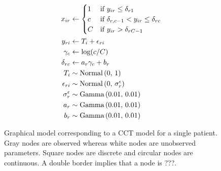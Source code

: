 \documentclass{article}
\newcommand{\DON}[1]{\todo[inline, color=white]{Don: {#1}}}
\newcommand{\Irater}{r}
\newcommand{\Iitem}{i}
\newcommand{\Incat}{c}
\newcommand{\Tncat}{\expandafter\MakeUppercase\expandafter{\Incat}}
\newcommand{\dnorm}[2]{\text{Normal}\left(#1,\,#2\right)}
\newcommand{\dgamma}[2]{\text{Gamma}\left(#1,\,#2\right)}
\begin{document}
\begin{figure}[!ht]
\begin{minipage}{0.5\textwidth}
		\end{minipage}\hfill
	\begin{minipage}{0.5\textwidth}
		{\large
		\begin{align*}
			x_{\Iitem\Irater} &\leftarrow 
			\begin{cases}
			1		& \text{if } y_{\Iitem\Irater} \leq \delta_{\Irater 1} \\
			\Incat	& \text{if } \delta_{\Irater, \Incat-1} < y_{\Iitem\Irater} \leq \delta_{\Irater\Incat} \\
			\Tncat	& \text{if } y_{\Iitem\Irater} > \delta_{\Irater \Tncat-1}
			\end{cases}\\
			y_{\Irater\Iitem} &\leftarrow T_\Iitem + \epsilon_{\Irater\Iitem}\\
			\gamma_\Incat &\leftarrow \log(\Incat / \Tncat)\\
			\delta_{\Irater\Incat} &\leftarrow a_\Irater  \gamma_\Incat + b_\Irater\\
			T_\Iitem &\sim \dnorm{0}{1}\\
			\epsilon_{\Irater\Iitem} &\sim \dnorm{0}{\sigma^\epsilon_\Irater} \\
			\sigma^\epsilon_\Irater &\sim \dgamma{0.01}{0.01} \\
			a_\Irater &\sim \dgamma{0.01}{0.01} \\
			b_\Irater &\sim \dgamma{0.01}{0.01}
		\end{align*}
		}%
	\end{minipage}
	\caption{Graphical model corresponding to a CCT model for a single patient. Gray nodes are observed whereas white nodes are unobserved parameters. Square nodes are discrete and circular nodes are continuous. A double border implies that a node is ???.}
	\label{model:CCTO}
\end{figure}
\end{document}
